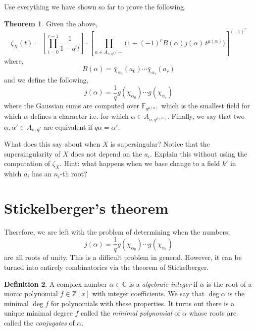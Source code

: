 \documentclass[12pt]{article}
\newcommand{\ZZ}{\mathbb{Z}}
\newcommand{\FF}{\mathbb{F}}
\newcommand{\CC}{\mathbb{C}}
\theoremstyle{remark}
\theoremstyle{definition}
\newtheorem{theorem}{Theorem}[subsection]
\newtheorem{defn}[theorem]{Definition}
\begin{document}
Use everything we have shown so far to prove the following.

\begin{theorem} \label{thm:diagonal_zeta_function}
Given the above,
\[ \zeta_X(t) = \left[ \prod_{i = 0}^{r-1} \frac{1}{1-q^i t} \right] \cdot  \left[ \prod_{\alpha \in A_{n,q^f} / \sim} \bigg( 1 + (-1)^r B(\alpha) j(\alpha) \, t^{\mu(\alpha)} \bigg) \right]^{(-1)^r} \]
where,
\[ B(\alpha) = \bar{\chi}_{\alpha_0}(a_0) \cdots \bar{\chi}_{\alpha_r}(a_r) \]
and we define the following,
\[ j(\alpha) = \frac{1}{q} g(\chi_{\alpha_0}) \cdots g(\chi_{\alpha_r}) \]
where the Gaussian sums are computed over $\FF_{q^{\mu(\alpha)}}$ which is the smallest field for which $\alpha$ defines a character i.e. for which $\alpha \in A_{n,q^{\mu(\alpha)}}$. Finally, we say that two $\alpha, \alpha' \in A_{n,q^f}$ are equivalent if $q \alpha = \alpha'$.
\end{theorem}

What does this say about when $X$ is supersingular? Notice that the supersingularity of $X$ does not depend on the $a_i$. Explain this without using the computation of $\zeta_X$. Hint: what happens when we base change to a field $k'$ in which $a_i$ has an $n_i$-th root?

\section{Stickelberger's theorem}

Therefore, we are left with the problem of determining when the numbers,
\[ j(\alpha) = \frac{1}{q} g(\chi_{\alpha_0}) \cdots g(\chi_{\alpha_r}) \]
are all roots of unity. This is a difficult problem in general. However, it can be turned into entirely combinatorics via the theorem of Stickelberger.


\begin{defn}
A complex number $\alpha \in \CC$ is a \textit{algebraic integer} if $\alpha$ is the root of a monic polynomial $f \in \ZZ[x]$ with integer coefficients. We say that $\deg{\alpha}$ is the minimal $\deg{f}$ for polynomials with these properties. It turns out there is a unique minimal degree $f$ called the \textit{minimal polynomial} of $\alpha$ whose roots are called the \textit{conjugates} of $\alpha$.
\end{defn}

\subsection{}
\end{document}
